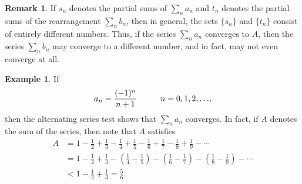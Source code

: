 \documentclass[12pt]{article}
\theoremstyle{definition}
\newtheorem{example}[definition]{Example}
\newtheorem{remark}[definition]{Remark}
\theoremstyle{theorem}
\begin{document}
\begin{remark}
If $s_n$ denotes the partial sums of $\sum_n a_n$ and $t_n$ denotes the partial sums of the rearrangement $\sum_n b_n$, then in general, the sets $\{s_n\}$ and $\{t_n\}$ consist of entirely different numbers. Thus, if the series $\sum_na_n$ converges to $A$, then the series $\sum_n b_n$ may converge to a different number, and in fact, may not even converge at all.  
\end{remark}

\begin{example}
If 
\[
a_n = \frac{(-1)^n}{n+1} \hspace{10mm} {n=0,1,2, \ldots},
\]
then the alternating series test shows that $\sum_n a_n$ converges. In fact, if $A$ denotes the sum of the series, then note that $A$ satisfies 
\begin{align*}
A  &= 1 - \frac{1}{2} + \frac{1}{3} - \frac{1}{4} + \frac{1}{5} - \frac{1}{6} + \frac{1}{7} - \frac{1}{8} + \frac{1}{9} - \cdots \\
&= 1 - \frac{1}{2} + \frac{1}{3} - \left(\frac{1}{4} - \frac{1}{5}\right) - \left(\frac{1}{6} - \frac{1}{7}\right) - \left(\frac{1}{8} - \frac{1}{9}\right) - \cdots \\
&< 1 - \frac{1}{2} + \frac{1}{3} = \frac{5}{6}.
\end{align*}


\end{example}
\end{document}
